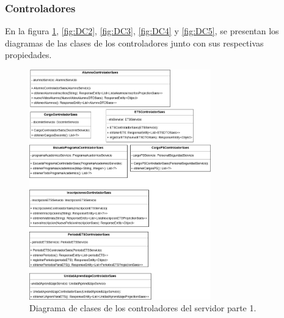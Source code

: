 \subsubsection{Controladores}
En la figura \ref{fig:DC1}, \ref{fig:DC2}, \ref{fig:DC3}, \ref{fig:DC4} y \ref{fig:DC5}, se presentan los diagramas de las clases de los controladores junto con sus respectivas propiedades.

\begin{figure}[htbp!]
	\begin{center}
		\includegraphics[width=0.7\textwidth]{Clases/Controlador1.png}
		\caption{Diagrama de clases de los controladores del servidor parte 1.}
		\label{fig:DC1}
	\end{center}
\end{figure}

